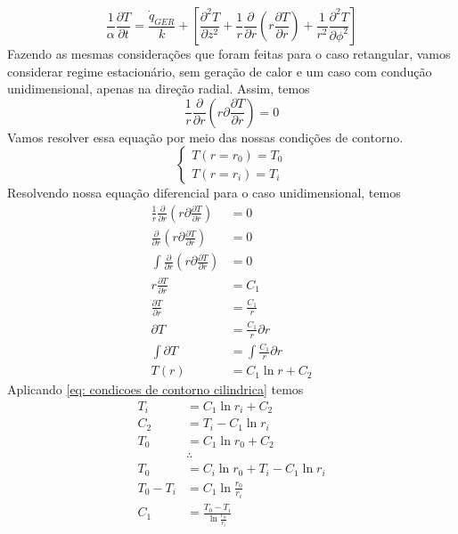 \begin{equation}
    \frac{1}{\alpha }  \frac{\partial T}{\partial t} = \frac{\dot{q}_{GER} }{k} + \left[ \frac{\partial ^{2}  T }{\partial z ^{2} } + \frac{1}{r} \frac{\partial }{\partial r} \left( r \frac{\partial T}{\partial r}  \right) + \frac{1}{r^{2} } \frac{\partial ^{2}  T }{\partial \phi  ^{2} } \right] 
\end{equation}
Fazendo as mesmas considerações que foram feitas para o caso retangular, vamos considerar regime
estacionário, sem geração de calor e um caso com condução unidimensional, apenas na direção radial.
Assim, temos
\begin{equation}\label{eq: conducao unidemensional cilindrica}
    \frac{1}{r} \frac{\partial }{\partial r}  \left(r \partial\frac{\partial T}{\partial r} \right) = 0
\end{equation}
Vamos resolver essa equação por meio das nossas condições de contorno.
\begin{equation}\label{eq: condicoes de contorno cilindrica}
    \begin{cases}
        T(r = r_0) = T_{0} \\
        T(r= r_i) = T_{i}
    \end{cases}
\end{equation}
Resolvendo nossa equação diferencial para o caso unidimensional, temos
\begin{align}
    \frac{1}{r} \frac{\partial }{\partial r}  \left(r \partial\frac{\partial T}{\partial r} \right) &= 0\\
    \frac{\partial }{\partial r}  \left(r \partial\frac{\partial T}{\partial r} \right) &= 0\\
    \int\frac{\partial}{\partial r}   \left(r \partial\frac{\partial T}{\partial r} \right) &= 0\\
    r \frac{\partial T}{\partial r} &= C_1\\
    \frac{\partial T}{\partial r} &= \frac{C_1}{r}\\
    \partial T &= \frac{C_1}{r} \partial r\\
    \int \partial T &= \int \frac{C_1}{r} \partial r\\
    T(r) &= C_1 \ln r + C_2
\end{align}
Aplicando \eqref{eq: condicoes de contorno cilindrica} temos
\begin{align}
    T_i &= C_1 \ln r_i + C_2\\
    C_2 &= T_i - C_1 \ln r_i\\
    T_0 &= C_1 \ln r_0 + C_2\\
    &\therefore\\
    T_0 &= C_i \ln r_0 + T_i - C_1 \ln r_i\\
    T_0 - T_i &= C_1 \ln \frac{r_0}{r_i}\\
    C_1 &= \frac{T_0 - T_i}{\ln \frac{r_0}{r_i}}
\end{align}
